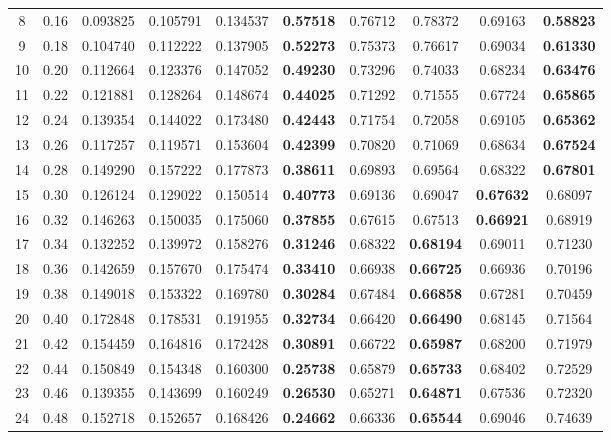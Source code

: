 \begin{table}[!htb]
\begin{threeparttable}
\begin{tabular}{cc*8{S[table-format=1.3]}}
8  & 0.16  &  0.093825 & 0.105791 & 0.134537 & \bfseries 0.57518  &  0.76712 & 0.78372 & 0.69163 & \bfseries 0.58823 \\
9  & 0.18  &  0.104740 & 0.112222 & 0.137905 & \bfseries 0.52273  &  0.75373 & 0.76617 & 0.69034 & \bfseries 0.61330 \\
10 & 0.20  &  0.112664 & 0.123376 & 0.147052 & \bfseries 0.49230  &  0.73296 & 0.74033 & 0.68234 & \bfseries 0.63476 \\
11 & 0.22  &  0.121881 & 0.128264 & 0.148674 & \bfseries 0.44025  &  0.71292 & 0.71555 & 0.67724 & \bfseries 0.65865 \\
12 & 0.24  &  0.139354 & 0.144022 & 0.173480 & \bfseries 0.42443  &  0.71754 & 0.72058 & 0.69105 & \bfseries 0.65362 \\
13 & 0.26  &  0.117257 & 0.119571 & 0.153604 & \bfseries 0.42399  &  0.70820 & 0.71069 & 0.68634 & \bfseries 0.67524 \\
14 & 0.28  &  0.149290 & 0.157222 & 0.177873 & \bfseries 0.38611  &  0.69893 & 0.69564 & 0.68322 & \bfseries 0.67801 \\
15 & 0.30  &  0.126124 & 0.129022 & 0.150514 & \bfseries 0.40773  &  0.69136 & 0.69047 & \bfseries 0.67632 & 0.68097 \\
16 & 0.32  &  0.146263 & 0.150035 & 0.175060 & \bfseries 0.37855  &  0.67615 & 0.67513 & \bfseries 0.66921 & 0.68919 \\
17 & 0.34  &  0.132252 & 0.139972 & 0.158276 & \bfseries 0.31246  &  0.68322 & \bfseries 0.68194 & 0.69011 & 0.71230 \\
18 & 0.36  &  0.142659 & 0.157670 & 0.175474 & \bfseries 0.33410  &  0.66938 & \bfseries 0.66725 & 0.66936 & 0.70196 \\
19 & 0.38  &  0.149018 & 0.153322 & 0.169780 & \bfseries 0.30284  &  0.67484 & \bfseries 0.66858 & 0.67281 & 0.70459 \\
20 & 0.40  &  0.172848 & 0.178531 & 0.191955 & \bfseries 0.32734  &  0.66420 & \bfseries 0.66490 & 0.68145 & 0.71564 \\
21 & 0.42  &  0.154459 & 0.164816 & 0.172428 & \bfseries 0.30891  &  0.66722 & \bfseries 0.65987 & 0.68200 & 0.71979 \\
22 & 0.44  &  0.150849 & 0.154348 & 0.160300 & \bfseries 0.25738  &  0.65879 & \bfseries 0.65733 & 0.68402 & 0.72529 \\
23 & 0.46  &  0.139355 & 0.143699 & 0.160249 & \bfseries 0.26530  &  0.65271 & \bfseries 0.64871 & 0.67536 & 0.72320 \\
24 & 0.48  &  0.152718 & 0.152657 & 0.168426 & \bfseries 0.24662  &  0.66336 & \bfseries 0.65544 & 0.69046 & 0.74639 \\

\end{tabular}
\end{threeparttable}
\end{table}
